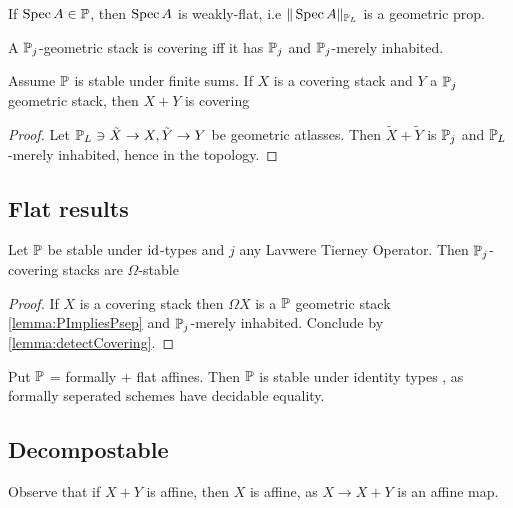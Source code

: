 \begin{lemma}
	If $\operatorname{Spec} A \in \mathbb{P}$, then $\operatorname{Spec} A$ is weakly-flat, i.e $\| \operatorname{Spec} A\|_{\mathbb{P}_L}$ is a geometric prop.
\end{lemma}
\begin{lemma}{\label{lemma:detectCovering}}
	A $\mathbb{P}_j$-geometric stack is covering iff it has $\mathbb{P}_j$ and ${\mathbb{P}_j}$-merely inhabited.
\end{lemma}

\begin{lemma}
	Assume $\mathbb{P}$ is stable under finite sums. If $X$ is a covering stack and $Y$ a $\mathbb{P}_j$ geometric stack, then $X + Y$ is covering
\end{lemma}
\begin{proof}
	Let ${\mathbb{P}_L} \ni \tilde X \to X, \tilde Y \to Y$ be geometric atlasses. Then $\tilde X+ \tilde Y$ is $\mathbb{P}_j$ and ${\mathbb{P}_L}$-merely inhabited, hence in the topology.
\end{proof}
\subsection{Flat results}

\begin{lemma}
	Let $\mathbb{P}$ be stable under $\operatorname{id}$-types and $j$ any Lavwere Tierney Operator. Then $\mathbb{P}_j$-covering stacks are $\Omega$-stable
\end{lemma}
\begin{proof}
	If $X$ is a covering stack then $\Omega X$ is a $\mathbb{P}$ geometric stack \ref{lemma:PImpliesPsep} and ${\mathbb{P}_j}$-merely inhabited. Conclude by  \ref{lemma:detectCovering}.
\end{proof}
\begin{example}
	Put $\mathbb{P}$ = formally \etale $+$ flat affines. Then $\mathbb{P}$ is stable under identity types , as formally \etale seperated schemes have decidable equality.  %
\end{example}

\subsection{Decompostable}
 Observe that if $X + Y$ is affine, then $X$ is affine, as $X \to X + Y$ is an affine map.

